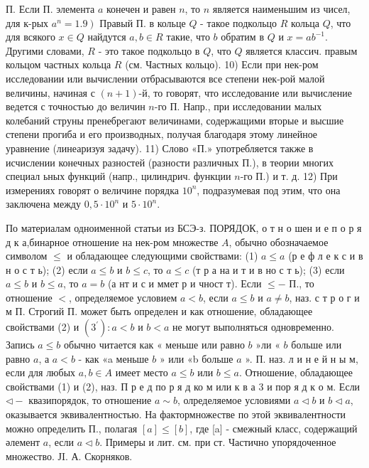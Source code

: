 \documentclass[10pt]{article}
\begin{document}
П. Если П. элемента $a$ конечен и равен $n$, то $n$ является наименьшим из чисел, для к-рых $\left.a^{n}=1.9\right)$ Правый П. в кольце $Q$ - такое подкольцо $R$ кольца $Q$, что для всякого $x \in Q$ найдутся $a, b \in R$ такие, что $b$ обратим в $Q$ и $x=a b^{-1}$. Другими словами, $R$ - это такое подкольцо в $Q$, что $Q$ является классич. правым кольцом частных кольца $R$ (см. Частных кольцо). 10) Если при нек-ром исследовании или вычислении отбрасываются все степени нек-рой малой величины, начиная с $(n+1)$-й, то говорят, что исследование или вычисление ведется с точностью до величин $n$-го П. Напр., при исследовании малых колебаний струны пренебрегают величинами, содержащими вторые и высшие степени прогиба и его производных, получая благодаря этому линейное уравнение (линеаризуя задачу). 11) Слово «П.» употребляется также в исчислении конечных разностей (разности различных П.), в теории многих специал ьных функций (напр., цилиндрич. функции $n$-го П.) и т. д. 12) При измерениях говорят о величине порядка $10^{n}$, подразумевая под этим, что она заключена между $0,5 \cdot 10^{n}$ и $5 \cdot 10^{n}$.



По материалам одноименной статьи из БСЭ-з. ПОРЯДОК, о т н о шен и е п о р я д к а,бинарное отношение на нек-ром множестве $A$, обычно обозначаемое символом $\leqslant$ и обладающее следующими свойствами: (1) $a \leqslant a$ (р е ф л е к с и в н о с т ь); (2) если $a \leqslant b$ и $b \leqslant c$, то $a \leqslant c$ (т р а на и т и в но с т ь); (3) если $a \leqslant b$ и $b \leqslant a$, то $a=b$ (а нт и с и ммет р и чност т). Если $\leqslant-$ П., то отношение $<$, определяемое условием $a<b$, если $a \leqslant b$ и $a \neq b$, наз. с т р о г и м П. Строгий П. может быть определен и как отношение, обладающее свойствами (2) и $\left(3^{\prime}\right): a<b$ и $b<a$ не могут выполняться одновременно. Запись $a \leqslant b$ обычно читается как « меньше или равно $b$ »ли « $b$ больше или равно $a$, а $a<b$ - как «a меньше $b$ » или «b больше $a$ ». П. наз. л и н е й н ы м, если для любых $a, b \in A$ имеет место $a \leqslant b$ или $b \leqslant a$. Отношение, обладающее свойствами (1) и (2), наз. П р е д по р я д ко м или к в а 3 и пор я д к о м. Если $\triangleleft-$ квазипорядок, то отношение $a \sim b$, олределяемое условиями $a \triangleleft b$ и $b \triangleleft a$, оказывается эквивалентностью. На фактормножестве по этой эквивалентности можно определить П., полагая $[a] \leqslant[b]$, где [a] - смежный класс, содержащий әлемент $a$, если $a \triangleleft b$. Примеры и лит. см. при ст. Частично упорядоченное множество. ЈI. А. Скорняков.
\end{document}
